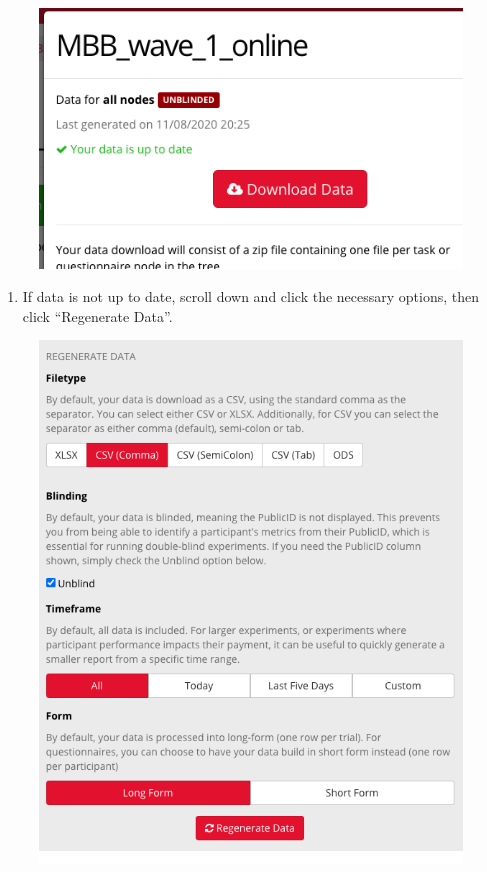 \documentclass[]{book}
\providecommand{\tightlist}{%
  \setlength{\itemsep}{0pt}\setlength{\parskip}{0pt}}
\begin{document}
\begin{figure}
\centering
\includegraphics{images/gorilla/7.png}
\caption{}
\end{figure}

\begin{enumerate}
\def\labelenumi{\arabic{enumi}.}
\setcounter{enumi}{3}
\tightlist
\item
  If data is not up to date, scroll down and click the necessary options, then click ``Regenerate Data''.
\end{enumerate}

\begin{figure}
\centering
\includegraphics{images/gorilla/8.png}
\caption{}
\end{figure}
\end{document}
